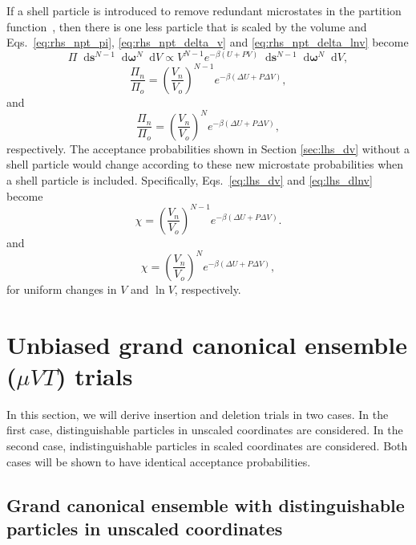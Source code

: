 \documentclass[
  9pt,
  bestpractices,
]{livecoms}
\newcommand*\diff{\mathop{}\!\mathrm{d}}
\begin{document}
If a shell particle is introduced to remove redundant microstates in the partition function~\cite{attard_density_1995, koper_length_1996, corti_deriving_1998, han_isothermal-isobaric_2001, corti_isothermal-isobaric_2001, corti_monte_2002, stroker_systematic_2021, hatch_theory_2024}, then there is one less particle that is scaled by the volume and Eqs.~\ref{eq:rhs_npt_pi}, \ref{eq:rhs_npt_delta_v} and \ref{eq:rhs_npt_delta_lnv} become 
\begin{equation}
\Pi \diff\mathbf{s}^{N-1}\diff\boldsymbol{\omega}^{N}\diff V \propto V^{N-1} e^{-\beta(U+P V)} \diff\mathbf{s}^{N-1} \diff\boldsymbol{\omega}^{N}\diff V,
\end{equation}
\begin{equation}
\frac{\Pi_n}{\Pi_o} = \left(\frac{V_n}{V_o}\right)^{N-1}e^{-\beta(\Delta U + P\Delta V)},
\end{equation}
and
\begin{equation}
\frac{\Pi_n}{\Pi_o} = \left(\frac{V_n}{V_o}\right)^{N}e^{-\beta(\Delta U + P\Delta V)},
\end{equation}
respectively.
The acceptance probabilities shown in Section \ref{sec:lhs_dv} without a shell particle would change according to these new microstate probabilities when a shell particle is included.
Specifically, Eqs.~\ref{eq:lhs_dv} and \ref{eq:lhs_dlnv} become
\begin{equation}
\chi=\left(\frac{V_n}{V_o}\right)^{N-1}e^{-\beta(\Delta U + P\Delta V)}.
\end{equation}
and
\begin{equation}
\chi=\left(\frac{V_n}{V_o}\right)^{N}e^{-\beta(\Delta U + P\Delta V)},
\end{equation}
for uniform changes in $V$ and $\ln V$, respectively.

\section{\label{sec:rhs_muvt}Unbiased grand canonical ensemble ($\mu VT$) trials}

In this section, we will derive insertion and deletion trials in two cases.
In the first case, distinguishable particles in unscaled coordinates are considered.
In the second case, indistinguishable particles in scaled coordinates are considered.
Both cases will be shown to have identical acceptance probabilities.

\subsection{\label{sec:rhs_muvt_distinguishable}Grand canonical ensemble with distinguishable particles in unscaled coordinates}
\end{document}
